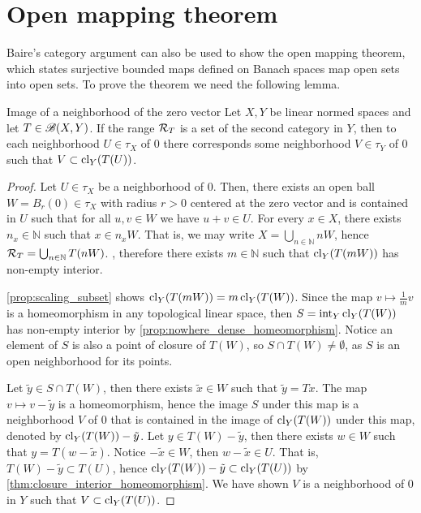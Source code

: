 \section{Open mapping theorem}
Baire's category argument can also be used to show the open mapping theorem, which states surjective bounded maps defined on Banach spaces map open sets into open sets. To prove the theorem we need the following lemma.
\begin{lemma}{Image of a neighborhood of the zero vector}{}
    Let \(X,Y\) be linear normed spaces and let \(T \in \mathscr{B}(X,Y)\). If the range \(\mathcal{R}_{T}\) is a set of the second category in \(Y\), then to each neighborhood \(U \in \tau_X\) of \(0\) there corresponds some neighborhood \(V \in \tau_Y\) of \(0\) such that \(V \subset \operatorname{cl}_Y(T(U))\).
\end{lemma}
\begin{proof}
    Let \(U \in \tau_X\) be a neighborhood of \(0\). Then, there exists an open ball \(W = B_r(0) \in \tau_X\) with radius \(r > 0\) centered at the zero vector and is contained in \(U\) such that for all \(u, v \in W\) we have \(u + v \in U\). For every \(x \in X\), there exists \(n_x \in \mathbb{N}\) such that \(x \in n_x W\). That is, we may write \(X = \bigcup_{n\in \mathbb{N}} nW\), hence \(\mathcal{R}_{T} = \bigcup_{n\in \mathbb{N}} T(nW)\). , therefore there exists \(m \in \mathbb{N}\) such that \(\operatorname{cl}_Y(T(mW))\) has non-empty interior.

    \cref{prop:scaling_subset} shows \(\operatorname{cl}_Y(T(mW)) = m \operatorname{cl}_Y(T(W))\). Since the map \(v \mapsto \frac1m v\) is a homeomorphism in any topological linear space, then \(S = \operatorname{int}_Y\operatorname{cl}_Y(T(W))\) has non-empty interior by \cref{prop:nowhere_dense_homeomorphism}. Notice an element of \(S\) is also a point of closure of \(T(W)\), so \(S \cap T(W) \neq \emptyset\), as \(S\) is an open neighborhood for its points.

    Let \(\tilde{y} \in S \cap T(W)\), then there exists \(\tilde{x} \in W\) such that \(\tilde{y} = Tx\). The map \(v \mapsto v - \tilde{y}\) is a homeomorphism, hence the image
    \(S\) under this map is a neighborhood \(V\) of \(0\) that is contained in the image of \(\operatorname{cl}_Y(T(W))\) under this map, denoted by \(\operatorname{cl}_Y(T(W)) - \tilde{y}\). Let \(y \in T(W) - \tilde{y}\), then there exists \(w \in W\) such that \(y = T(w - \tilde{x})\). Notice \(-\tilde{x} \in W\), then \(w - \tilde{x} \in U\). That is, \(T(W) - \tilde{y} \subset T(U)\), hence \(\operatorname{cl}_Y(T(W)) - \tilde{y} \subset \operatorname{cl}_Y(T(U))\) by \cref{thm:closure_interior_homeomorphism}. We have shown \(V\) is a neighborhood of \(0\) in \(Y\) such that \(V \subset \operatorname{cl}_Y(T(U))\).
\end{proof}
